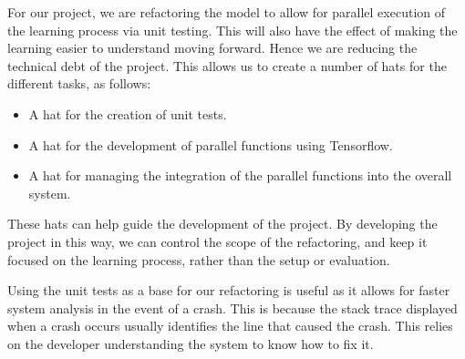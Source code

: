
For our project, we are refactoring the model to allow for parallel execution of the learning process via unit testing.
This will also have the effect of making the learning easier to understand moving forward.
Hence we are reducing the technical debt of the project.
This allows us to create a number of hats for the different tasks, as follows:
\begin{itemize}
    \item A hat for the creation of unit tests.
    \item A hat for the development of parallel functions using Tensorflow.
    \item A hat for managing the integration of the parallel functions into the overall system.
\end{itemize}
These hats can help guide the development of the project.
By developing the project in this way, we can control the scope of the refactoring, and keep it focused on the learning process, rather than the setup or evaluation.

Using the unit tests as a base for our refactoring is useful as it allows for faster system analysis in the event of a crash.
This is because the stack trace displayed when a crash occurs usually identifies the line that caused the crash.
This relies on the developer understanding the system to know how to fix it.

